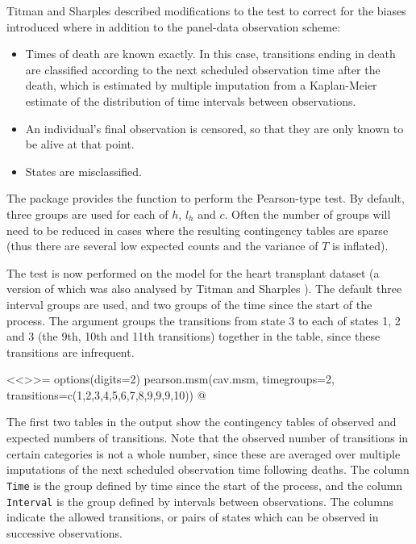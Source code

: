 Titman and Sharples \cite{titman:sharples} described modifications to
the test to correct for the biases introduced where in addition to the
panel-data observation scheme:
\begin{itemize}
\item Times of death are known exactly.  In this case, transitions
  ending in death are classified according to the next scheduled
  observation time after the death, which is estimated by multiple
  imputation from a Kaplan-Meier estimate of the distribution of time
  intervals between observations.

\item An individual's final observation is censored, so that they are
  only known to be alive at that point.

\item States are misclassified.
\end{itemize}

The  package provides the function
 to perform the Pearson-type test.  By default,
three groups are used for each of $h$, $l_h$ and $c$.  Often the
number of groups will need to be reduced in cases where the resulting
contingency tables are sparse (thus there are several low expected
counts and the variance of $T$ is inflated).

The test is now performed on the model  for the heart
transplant dataset (a version of which was also analysed by
Titman and Sharples \cite{titman:sharples}). The default three interval groups are used,
and two groups of the time since the start of the process. The
 argument groups the transitions from state 3 to
each of states 1, 2 and 3 (the 9th, 10th and 11th transitions)
together in the table, since these transitions are infrequent.

<<>>=
options(digits=2)
pearson.msm(cav.msm, timegroups=2,
            transitions=c(1,2,3,4,5,6,7,8,9,9,9,10))
@

The first two tables in the output show the contingency tables of
observed and expected numbers of transitions.  Note that the observed
number of transitions in certain categories is not a whole number,
since these are averaged over multiple imputations of the next
scheduled observation time following deaths.  The column \texttt{Time}
is the group defined by time since the start of the process, and the
column \texttt{Interval} is the group defined by intervals between
observations.  The columns indicate the allowed transitions, or pairs
of states which can be observed in successive observations.

